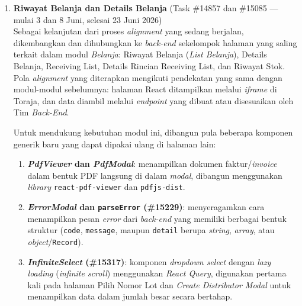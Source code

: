 \begin{enumerate}
          Proses ini menuntut koordinasi dengan Tim \textit{Back-End} yang cukup
          intensif, karena beberapa endpoint perlu dibangun dari awal atau dimodifikasi
          agar sesuai dengan kebutuhan data di sisi tampilan. Keterlibatan aktif di sisi
          Toraja pada fase ini menjadi awal dari transisi peran Tim \textit{Front-End}
          menuju Full-Stack, sebagaimana yang disebutkan dalam rencana pengembangan tim
          di Subbab 3.2.

    \item \textbf{Riwayat Belanja dan Details Belanja} (Task \#14857 dan \#15085 --- mulai 3 dan 8 Juni, selesai 23 Juni 2026) \\
          Sebagai kelanjutan dari proses \textit{alignment} yang sedang berjalan, dikembangkan
          dan dihubungkan ke \textit{back-end} sekelompok halaman yang saling terkait dalam
          modul \textit{Belanja}: Riwayat Belanja (\textit{List Belanja}), Details Belanja,
          Receiving List, Details Rincian Receiving List, dan Riwayat Stok. Pola
          \textit{alignment} yang diterapkan mengikuti pendekatan yang sama dengan
          modul-modul sebelumnya: halaman React ditampilkan melalui \textit{iframe} di
          Toraja, dan data diambil melalui \textit{endpoint} yang dibuat atau disesuaikan
          oleh Tim \textit{Back-End}.

          Untuk mendukung kebutuhan modul ini, dibangun pula beberapa komponen generik
          baru yang dapat dipakai ulang di halaman lain:
          \begin{enumerate}
              \item \textbf{\textit{PdfViewer} dan \textit{PdfModal}}: menampilkan dokumen faktur/\textit{invoice} dalam bentuk PDF langsung di dalam \textit{modal}, dibangun menggunakan \textit{library} \texttt{react-pdf-viewer} dan \texttt{pdfjs-dist}.
              \item \textbf{\textit{ErrorModal} dan \texttt{parseError} (\#15229)}: menyeragamkan cara menampilkan pesan \textit{error} dari \textit{back-end} yang memiliki berbagai bentuk struktur (\texttt{code}, \texttt{message}, maupun \texttt{detail} berupa \textit{string}, \textit{array}, atau \textit{object}/\texttt{Record}).
              \item \textbf{\textit{InfiniteSelect} (\#15317)}: komponen \textit{dropdown select} dengan \textit{lazy loading} (\textit{infinite scroll}) menggunakan \textit{React Query}, digunakan pertama kali pada halaman Pilih Nomor Lot dan \textit{Create Distributor Modal} untuk menampilkan data dalam jumlah besar secara bertahap.
          \end{enumerate}


\end{enumerate}
